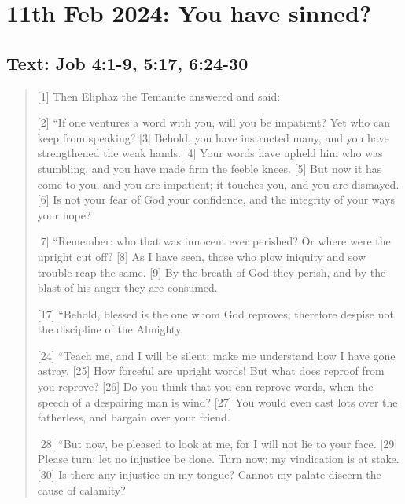 \setcounter{figure}{0}

\section{11th Feb 2024: You have sinned?}
\subsection*{Text: Job 4:1-9, 5:17, 6:24-30}
  \begin{quote}
    [1] Then Eliphaz the Temanite answered and said:

    [2] “If one ventures a word with you, will you be impatient?
        Yet who can keep from speaking?
    [3] Behold, you have instructed many,
        and you have strengthened the weak hands.
    [4] Your words have upheld him who was stumbling,
        and you have made firm the feeble knees.
    [5] But now it has come to you, and you are impatient;
        it touches you, and you are dismayed.
    [6] Is not your fear of God your confidence,
        and the integrity of your ways your hope?


    [7] “Remember: who that was innocent ever perished?
        Or where were the upright cut off?
    [8] As I have seen, those who plow iniquity
        and sow trouble reap the same.
    [9] By the breath of God they perish,
        and by the blast of his anger they are consumed.

    [17] “Behold, blessed is the one whom God reproves;
        therefore despise not the discipline of the Almighty.

    [24] “Teach me, and I will be silent;
        make me understand how I have gone astray.
    [25] How forceful are upright words!
        But what does reproof from you reprove?
    [26] Do you think that you can reprove words,
        when the speech of a despairing man is wind?
    [27] You would even cast lots over the fatherless,
        and bargain over your friend.


    [28] “But now, be pleased to look at me,
        for I will not lie to your face.
    [29] Please turn; let no injustice be done.
        Turn now; my vindication is at stake.
    [30] Is there any injustice on my tongue?
        Cannot my palate discern the cause of calamity?
  \end{quote}
